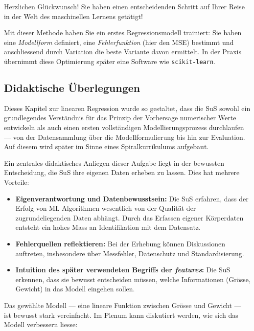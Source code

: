 \begin{lpu}
Herzlichen Glückwunsch! Sie haben einen entscheidenden Schritt auf Ihrer Reise in der Welt des maschinellen Lernens getätigt!

\begin{theorie}
Mit dieser Methode haben Sie ein erstes Regressionsmodell trainiert: Sie haben eine \emph{Modellform} definiert, eine \emph{Fehlerfunktion} (hier den MSE) bestimmt und anschliessend durch Variation die beste Variante davon ermittelt. In der Praxis übernimmt diese Optimierung später eine Software wie \texttt{scikit-learn}.
\end{theorie}
    
\end{lpu}

\subsection*{Didaktische Überlegungen}

Dieses Kapitel zur linearen Regression wurde so gestaltet, dass die SuS sowohl ein grundlegendes Verständnis für das Prinzip der Vorhersage numerischer Werte entwickeln als auch einen ersten vollständigen Modellierungsprozess durchlaufen — von der Datensammlung über die Modellformulierung bis hin zur Evaluation. Auf diesem wird später im Sinne eines Spiralkurrikulums aufgebaut.

Ein zentrales didaktisches Anliegen dieser Aufgabe liegt in der bewussten Entscheidung, die SuS ihre eigenen Daten erheben zu lassen. Dies hat mehrere Vorteile:

\begin{itemize}
  \item \textbf{Eigenverantwortung und Datenbewusstsein:} Die SuS erfahren, dass der Erfolg von ML-Algorithmen wesentlich von der Qualität der zugrundeliegenden Daten abhängt. Durch das Erfassen eigener Körperdaten entsteht ein hohes Mass an Identifikation mit dem Datensatz.
  
  \item \textbf{Fehlerquellen reflektieren:} Bei der Erhebung können Diskussionen auftreten, insbesondere über Messfehler, Datenschutz und Standardisierung.
  
  \item \textbf{Intuition des später verwendeten Begriffs der \emph{features}:} Die SuS erkennen, dass sie bewusst entscheiden müssen, welche Informationen (Grösse, Gewicht) in das Modell eingehen sollen.
\end{itemize}

Das gewählte Modell — eine lineare Funktion zwischen Grösse und Gewicht — ist bewusst stark vereinfacht. Im Plenum kann diskutiert werden, wie sich das Modell verbessern liesse:

